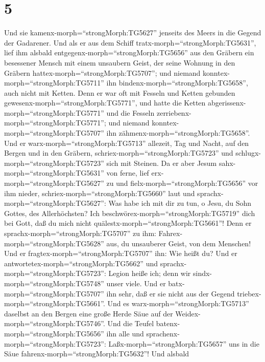 \hypertarget{section-4}{%
\section{5}\label{section-4}}

 Und sie kamenx-morph=``strongMorph:TG5627'' jenseits des
Meers in die Gegend der Gadarener.  Und als er aus dem
Schiff tratx-morph=``strongMorph:TG5631'', lief ihm alsbald
entgegenx-morph=``strongMorph:TG5656'' aus den Gräbern ein besessener
Mensch mit einem unsaubern Geist,  der seine Wohnung in den
Gräbern hattex-morph=``strongMorph:TG5707''; und niemand
konntex-morph=``strongMorph:TG5711'' ihn
bindenx-morph=``strongMorph:TG5658'', auch nicht mit Ketten.
 Denn er war oft mit Fesseln und Ketten gebunden
gewesenx-morph=``strongMorph:TG5771'', und hatte die Ketten
abgerissenx-morph=``strongMorph:TG5771'' und die Fesseln
zerriebenx-morph=``strongMorph:TG5771''; und niemand
konntex-morph=``strongMorph:TG5707'' ihn
zähmenx-morph=``strongMorph:TG5658''.  Und er
warx-morph=``strongMorph:TG5713'' allezeit, Tag und Nacht, auf den
Bergen und in den Gräbern, schriex-morph=``strongMorph:TG5723'' und
schlugx-morph=``strongMorph:TG5723'' sich mit Steinen.  Da
er aber Jesum sahx-morph=``strongMorph:TG5631'' von ferne, lief
erx-morph=``strongMorph:TG5627'' zu und
fielx-morph=``strongMorph:TG5656'' vor ihm nieder,
schriex-morph=``strongMorph:TG5660'' laut und
sprachx-morph=``strongMorph:TG5627'':  Was habe ich mit dir
zu tun, o Jesu, du Sohn Gottes, des Allerhöchsten? Ich
beschwörex-morph=``strongMorph:TG5719'' dich bei Gott, daß du mich nicht
quälestx-morph=``strongMorph:TG5661''!  Denn er
sprachx-morph=``strongMorph:TG5707'' zu ihm:
Fahrex-morph=``strongMorph:TG5628'' aus, du unsauberer Geist, von dem
Menschen!  Und er fragtex-morph=``strongMorph:TG5707'' ihn:
Wie heißt du? Und er antwortetex-morph=``strongMorph:TG5662'' und
sprachx-morph=``strongMorph:TG5723'': Legion heiße ich; denn wir
sindx-morph=``strongMorph:TG5748'' unser viele.  Und er
batx-morph=``strongMorph:TG5707'' ihn sehr, daß er sie nicht aus der
Gegend triebex-morph=``strongMorph:TG5661''.  Und es
warx-morph=``strongMorph:TG5713'' daselbst an den Bergen eine große
Herde Säue auf der Weidex-morph=``strongMorph:TG5746''. 
Und die Teufel batenx-morph=``strongMorph:TG5656'' ihn alle und
sprachenx-morph=``strongMorph:TG5723'':
Laßx-morph=``strongMorph:TG5657'' uns in die Säue
fahrenx-morph=``strongMorph:TG5632''!  Und alsbald
